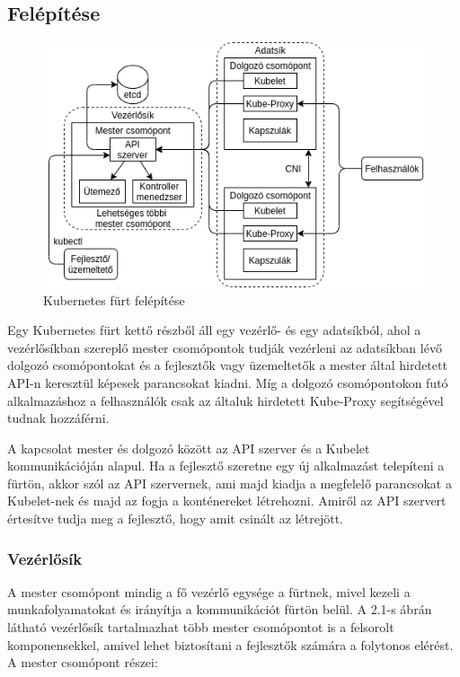 \subsection{Felépítése}

\begin{figure}[!ht]
	\centering
	\includegraphics[width=1\textwidth, keepaspectratio]{figures/k8s_architecture.png}
	\caption{Kubernetes fürt felépítése}
	\label{fig:HVSpaces}
\end{figure}

Egy Kubernetes fürt kettő részből áll egy vezérlő- és egy adatsíkból, ahol a 
vezérlősíkban szereplő mester csomópontok tudják vezérleni az adatsíkban 
lévő dolgozó csomópontokat és a fejlesztők vagy üzemeltetők a mester által
hirdetett API-n keresztül képesek parancsokat kiadni. Míg a dolgozó 
csomópontokon futó alkalmazáshoz a felhasználók csak az általuk hirdetett 
Kube-Proxy segítségével tudnak hozzáférni. 

A kapcsolat mester és dolgozó között az API szerver és a Kubelet kommunikációján
alapul. Ha a fejlesztő szeretne egy új alkalmazást telepíteni a fürtön, akkor
szól az API szervernek, ami majd kiadja a megfelelő parancsokat a Kubelet-nek 
és majd az fogja a konténereket létrehozni. Amiről az API szervert értesítve 
tudja meg a fejlesztő, hogy amit csinált az létrejött.

\subsubsection{Vezérlősík}

A mester csomópont mindig a fő vezérlő egysége a fürtnek, mivel kezeli a 
munkafolyamatokat és irányítja a kommunikációt fürtön belül. A 2.1-s ábrán
látható vezérlősík tartalmazhat  több mester csomópontot is a felsorolt 
komponensekkel, amivel lehet biztosítani a fejlesztők számára a folytonos 
elérést. A mester csomópont részei: 

